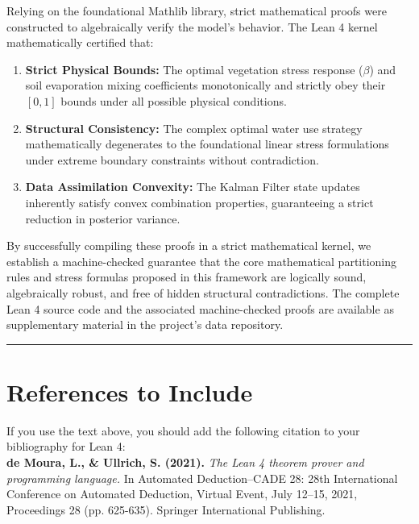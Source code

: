 \documentclass[12pt,a4paper]{article}
\begin{document}
Relying on the foundational Mathlib library, strict mathematical proofs were constructed to algebraically verify the model's behavior. The Lean 4 kernel mathematically certified that:
\begin{enumerate}
    \item \textbf{Strict Physical Bounds:} The optimal vegetation stress response ($\beta$) and soil evaporation mixing coefficients monotonically and strictly obey their $[0, 1]$ bounds under all possible physical conditions.
    \item \textbf{Structural Consistency:} The complex optimal water use strategy mathematically degenerates to the foundational linear stress formulations under extreme boundary constraints without contradiction.
    \item \textbf{Data Assimilation Convexity:} The Kalman Filter state updates inherently satisfy convex combination properties, guaranteeing a strict reduction in posterior variance.
\end{enumerate}

By successfully compiling these proofs in a strict mathematical kernel, we establish a machine-checked guarantee that the core mathematical partitioning rules and stress formulas proposed in this framework are logically sound, algebraically robust, and free of hidden structural contradictions. The complete Lean 4 source code and the associated machine-checked proofs are available as supplementary material in the project's data repository.

\vspace{0.3cm}
\rule{\textwidth}{0.4pt}

\vspace{0.5cm}
\section*{References to Include}
\noindent If you use the text above, you should add the following citation to your bibliography for Lean 4: \\
\small
\noindent \textbf{de Moura, L., \& Ullrich, S. (2021).} \textit{The Lean 4 theorem prover and programming language.} In Automated Deduction--CADE 28: 28th International Conference on Automated Deduction, Virtual Event, July 12--15, 2021, Proceedings 28 (pp. 625-635). Springer International Publishing.
\end{document}

